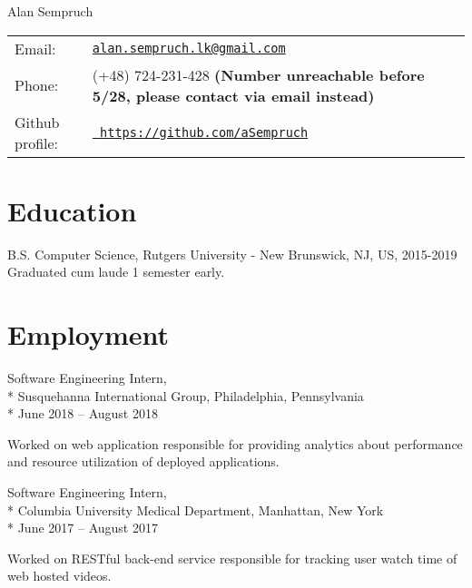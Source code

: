 \documentclass[letterpaper]{article}
\def\name{Alan Sempruch}
\renewenvironment{itemize}{
  \begin{list}{}{
      \setlength{\leftmargin}{1.5em}
    }
  }{
  \end{list}
}
\begin{document}
{\huge \name}


\vspace{0.25in}
\begin{minipage}{0.45\linewidth}
  \begin{tabular}{ll}
    Email: & \href{mailto:alan.sempruch.lk@gmail.com}{\tt alan.sempruch.lk@gmail.com} \\
    Phone: & (+48) 724-231-428 \footnotesize \textbf{(Number unreachable before 5/28, please contact via email instead)}\\
    Github profile: & \href{https://github.com/aSempruch}{\tt
      https://github.com/aSempruch} 
  \end{tabular}
\end{minipage}

\section*{Education}

\begin{itemize}
\item B.S. Computer Science, Rutgers University - New Brunswick, NJ, US, 2015-2019 \\
Graduated cum laude 1 semester early.
\end{itemize}


\section*{Employment}
\begin{itemize}

\item
  \begin{flushleft}
    Software Engineering Intern,\\*
    Susquehanna International Group, Philadelphia, Pennsylvania\\*
    June 2018 -- August 2018

    Worked on web application responsible for providing analytics 
    about performance and resource utilization of deployed applications.
  \end{flushleft}

\item
  \begin{flushleft}
    Software Engineering Intern,\\*
    Columbia University Medical Department, Manhattan, New York\\*
    June 2017 -- August 2017

    Worked on RESTful back-end service responsible for tracking user watch time of web hosted videos.
  \end{flushleft}
\end{itemize}
\end{document}
